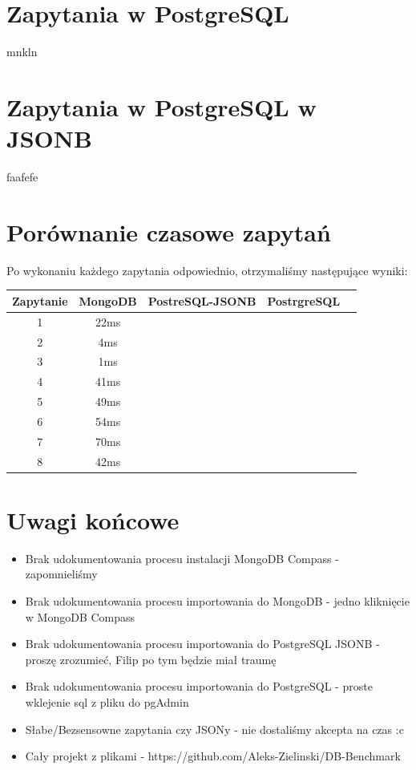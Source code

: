 \documentclass[11pt]{article}
\begin{document}
\newpage
\section{Zapytania w PostgreSQL}
	mnkln
\section{Zapytania w PostgreSQL w JSONB}
	faafefe

\newpage
\section{Porównanie czasowe zapytań}
	Po wykonaniu każdego zapytania odpowiednio, otrzymaliśmy następujące wyniki:
	\begin{table}[!ht]
	\begin{center}
		\begin{tabular}{ccccc}
			\toprule
			Zapytanie & MongoDB & PostreSQL-JSONB & PostrgreSQL &  \\
			\midrule
			1         & 22ms    &                 &             &  \\
			\midrule
			2         & 4ms     &                 &             &  \\
			\midrule
			3		  & 1ms     &                 &             &  \\
			\midrule
			4		  & 41ms    &                 &             &  \\
			\midrule
			5		  & 49ms    &                 &             &  \\
			\midrule
			6		  & 54ms    &                 &             &  \\
			\midrule
			7		  & 70ms    &                 &             &  \\
			\midrule
			8		  & 42ms    &                 &             &  \\
			\bottomrule
		\end{tabular}
	\end{center}
	\end{table}
\section{Uwagi końcowe}
	\begin{itemize}
		\item Brak udokumentowania procesu instalacji MongoDB Compass - zapomnieliśmy
		\item Brak udokumentowania procesu importowania do MongoDB - jedno kliknięcie w MongoDB Compass
		\item Brak udokumentowania procesu importowania do PostgreSQL JSONB - proszę zrozumieć, Filip po tym będzie miał traumę
		\item Brak udokumentowania procesu importowania do PostgreSQL - proste wklejenie sql z pliku do pgAdmin
		\item Słabe/Bezsensowne zapytania czy JSONy - nie dostaliśmy akcepta na czas :c
		\item Cały projekt z plikami - https://github.com/Aleks-Zielinski/DB-Benchmark
	\end{itemize}
\end{document}
